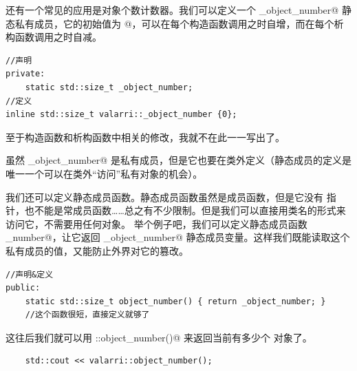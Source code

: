 还有一个常见的应用是对象个数计数器。我们可以定义一个 \lstinline@_object_number@ 静态私有成员，它的初始值为 @，可以在每个构造函数调用之时自增，而在每个析构函数调用之时自减。
\begin{lstlisting}
//声明
private:
    static std::size_t _object_number;
//定义
inline std::size_t valarri::_object_number {0};
\end{lstlisting}
至于构造函数和析构函数中相关的修改，我就不在此一一写出了。\par
虽然 \lstinline@_object_number@ 是私有成员，但是它也要在类外定义（静态成员的定义是唯一一个可以在类外``访问''私有对象的机会）。\par
我们还可以定义静态成员函数。静态成员函数虽然是成员函数，但是它没有 \lstinline@this@ 指针，也不能是常成员函数……总之有不少限制。但是我们可以直接用类名的形式来访问它，不需要用任何对象。
举个例子吧，我们可以定义静态成员函数 \lstinline@object_number@，让它返回 \lstinline@_object_number@ 静态成员变量。这样我们既能读取这个私有成员的值，又能防止外界对它的篡改。
\begin{lstlisting}
//声明&定义
public:
    static std::size_t object_number() { return _object_number; }
    //这个函数很短，直接定义就够了
\end{lstlisting}
这往后我们就可以用 \lstinline@valarri::object_number()@ 来返回当前有多少个 \lstinline@valarri@ 对象了。\par
\begin{lstlisting}
    std::cout << valarri::object_number();
\end{lstlisting}\par
